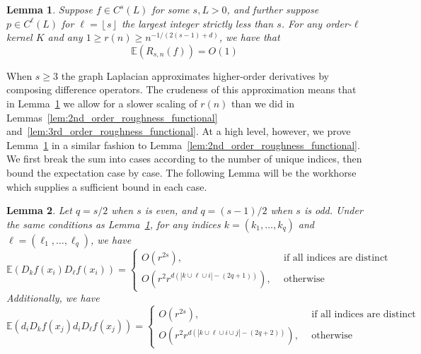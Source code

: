 \documentclass{article}
\newcommand{\abs}[1]{\left \lvert #1 \right \rvert}
\newcommand{\floor}[1]{\left\lfloor #1 \right\rfloor}
\newcommand{\1}{\mathbf{1}}
\newcommand{\Ebb}{\mathbb{E}}
\theoremstyle{alden}
\theoremstyle{aldenthm}
\newtheorem{lemma}{Lemma}
\theoremstyle{definition}
\theoremstyle{remark}
\begin{document}
\begin{lemma}
	\label{lem:roughness_functional_expectation}
	Suppose $f \in C^{s}(L)$ for some $s,L > 0$, and further suppose $p \in C^{\ell}(L)$ for $\ell = \floor{s}$ the largest integer strictly less than $s$. For any order-$\ell$ kernel $K$ and any $1 \geq r(n) \geq n^{-1/(2(s - 1)+d)}$, we have that
	\begin{equation*}
	\Ebb(R_{s,n}(f)) = O(1)
	\end{equation*} 
\end{lemma}
When $s \geq 3$ the graph Laplacian approximates higher-order derivatives by composing difference operators. The crudeness of this approximation means that in Lemma~\ref{lem:roughness_functional_expectation} we allow for a slower scaling of $r(n)$ than we did in Lemmas~\ref{lem:2nd_order_roughness_functional} and~\ref{lem:3rd_order_roughness_functional}. At a high level, however, we prove Lemma~\ref{lem:roughness_functional_expectation} in a similar fashion to Lemma~\ref{lem:2nd_order_roughness_functional}. We first break the sum into cases according to the number of unique indices, then bound the expectation case by case. 
The following Lemma will be the workhorse which supplies a sufficient bound in each case.
\begin{lemma}
	\label{lem:expected_difference_operators}
	Let $q = s/2$ when $s$ is even, and $q = (s - 1)/2$ when $s$ is odd. Under the same conditions as Lemma~\ref{lem:roughness_functional_expectation}, for any indices $k = (k_1,\ldots,k_q)$ and $\ell = (\ell_1,\ldots,\ell_q)$, we have
	\begin{equation}
	\label{eqn:expected_difference_operators_1}
	\Ebb(D_kf(x_i) D_\ell f(x_i)) =
	\begin{cases*}
	O(r^{2s}), & ~~\textrm{if all indices are distinct} \\
	O(r^{2} r^{d(\abs{k \cup \ell \cup i} - (2q + 1))}), & ~~\textrm{otherwise}~ 
	\end{cases*}
	\end{equation}
	Additionally, we have
	\begin{equation}
	\label{eqn:expected_difference_operators_2}
	\Ebb(d_iD_kf(x_j) d_iD_\ell f(x_j)) =
	\begin{cases*}
	O(r^{2s}), & ~~\textrm{if all indices are distinct} \\
	O(r^{2} r^{d(\abs{k \cup \ell \cup i \cup j} - (2q + 2))}), & ~~\textrm{otherwise}~ 
	\end{cases*}
	\end{equation}
\end{lemma}
\end{document}
